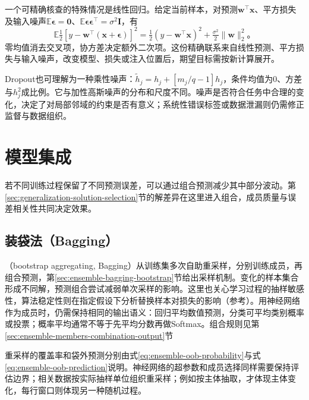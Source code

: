 一个可精确核查的特殊情况是线性回归。给定当前样本，对预测$\bm w^{\top}\bm x$、平方损失及输入噪声$\mathbb E\bm\epsilon=\bm0$、$\mathbb E\bm\epsilon\bm\epsilon^{\top}=\sigma^2\bm I$，有
\begin{equation}
  \mathbb E\tfrac12[y-\bm w^{\top}(\bm x+\bm\epsilon)]^2
  =\tfrac12(y-\bm w^{\top}\bm x)^2+\tfrac{\sigma^2}{2}\lVert\bm w\rVert_2^2\text{。}
  \label{eq:generalization-linear-noise}
\end{equation}
零均值消去交叉项，协方差决定额外二次项。这份精确联系来自线性预测、平方损失与输入噪声，改变模型、损失或注入位置后，期望目标需按新计算展开。

Dropout也可理解为一种乘性噪声：$\tilde h_j=h_j+[m_j/q-1]h_j$，条件均值为0、方差与$h_j^2$成比例。它与加性高斯噪声的分布和尺度不同。噪声是否符合任务中合理的变化，决定了对局部邻域的约束是否有意义；系统性错误标签或数据泄漏则仍需修正监督与数据组织。

\section{模型集成}
\label{sec:generalization-ensembles}

若不同训练过程保留了不同预测误差，可以通过组合预测减少其中部分波动。第\ref{sec:generalization-solution-selection}节的解差异在这里进入组合，成员质量与误差相关性共同决定效果。

\subsection{装袋法（Bagging）}
\label{sec:generalization-bagging}

（bootstrap aggregating, Bagging）从训练集多次自助重采样，分别训练成员，再组合预测，第\ref{sec:ensemble-bagging-bootstrap}节给出采样机制。变化的样本集合形成不同解，预测组合尝试减弱单次采样的影响。这里也关心学习过程的抽样敏感性，算法稳定性则在指定假设下分析替换样本对损失的影响（参考）。用神经网络作为成员时，仍需保持相同的输出语义：回归平均数值预测，分类可平均类别概率或投票；概率平均通常不等于先平均分数再做Softmax。组合规则见第\ref{sec:ensemble-members-combination-output}节

重采样的覆盖率和袋外预测分别由式\eqref{eq:ensemble-oob-probability}与式\eqref{eq:ensemble-oob-prediction}说明。神经网络的超参数和成员选择同样需要保持评估边界；相关数据按实际抽样单位组织重采样；例如按主体抽取，才体现主体变化，每行窗口则体现另一种随机过程。

